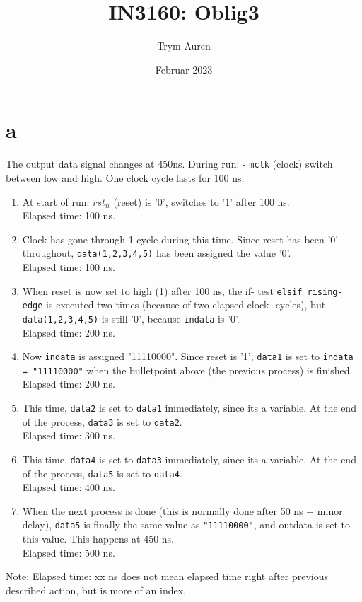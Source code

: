 

\title{IN3160: Oblig3}
\author{Trym Auren}
\date{Februar 2023}



    \maketitle
    \tableofcontents
    \section*{a}
        The output data signal changes at 450ns.
        During run:
        - \texttt{mclk} (clock) switch between low and high. One clock cycle lasts for 100 ns.
        \begin{enumerate}
            \item At start of run: \texttt{$rst_n$} (reset) is '0', switches to '1' after 100 ns.\\
                Elapsed time: 100 ns.
            \item Clock has gone through 1 cycle during this time. Since reset has been '0' throughout, \texttt{data(1,2,3,4,5)} has been assigned the value '0'.\\
                Elapsed time: 100 ns. 
            \item When reset is now set to high (1) after 100 ns, the if- test \texttt{elsif rising-edge} is executed two times (because of two elapsed clock- cycles), but \texttt{data(1,2,3,4,5)} is still '0', because \texttt{indata} is '0'.\\
                Elapsed time: 200 ns. 
            \item Now \texttt{indata} is assigned "11110000". Since reset is '1', \texttt{data1} is set to \texttt{indata = "11110000"} when the bulletpoint above (the previous process) is finished.\\
                Elapsed time: 200 ns.
            \item This time, \texttt{data2} is set to \texttt{data1} immediately, since its a variable. At the end of the process, \texttt{data3} is set to \texttt{data2}.\\
                Elapsed time: 300 ns.
            \item This time, \texttt{data4} is set to \texttt{data3} immediately, since its a variable. At the end of the process, \texttt{data5} is set to \texttt{data4}.\\
                Elapsed time: 400 ns.
            \item When the next process is done (this is normally done after 50 ns + minor delay), \texttt{data5} is finally the same value as \texttt{"11110000"}, and outdata is set to this value. This happens at 450 ns.\\
                Elapsed time: 500 ns.
        \end{enumerate}
        \begin{description}
            \item Note: Elapsed time: xx ns does not mean elapsed time right after previous described action, but is more of an index. 
        \end{description}

